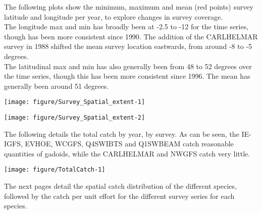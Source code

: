 \documentclass[12pt]{article}\usepackage[]{graphicx}\usepackage[]{color}
\makeatletter
\def\maxwidth{ %
  \ifdim\Gin@nat@width>\linewidth
    \linewidth
  \else
    \Gin@nat@width
  \fi
}
\newenvironment{knitrout}{}{} %
\makeatother
\begin{document}
The following plots show the minimum, maximum and mean (red points) survey
latitude and longitude per year, to explore changes in survey coverage. \\

The longitude max and min has broadly been at -2.5 to -12 for the time series,
though has been more consistent since 1990. The addition of the CARLHELMAR
survey in 1988 shifted the mean survey location eastwards, from around -8 to -5
degrees. \\

The latitudinal max and min has also generally been from 48 to 52 degrees over
the time series, though this has been more consistent since 1996. The mean has
generally been around 51 degrees.


\begin{knitrout}\footnotesize
{}\color{fgcolor}

{\centering \texttt{[image: figure/Survey\_Spatial\_extent-1]} 

}




{\centering \texttt{[image: figure/Survey\_Spatial\_extent-2]} 

}



\end{knitrout}


The following details the total catch by year, by survey. As can be seen, the
IE-IGFS, EVHOE, WCGFS, Q4SWIBTS and Q1SWBEAM catch reasonable quantities of
gadoids, while the CARLHELMAR and NWGFS catch very little. \\

\begin{knitrout}\footnotesize
{}\color{fgcolor}

{\centering \texttt{[image: figure/TotalCatch-1]} 

}



\end{knitrout}

The next pages detail the spatial catch distribution of the different species,
followed by the catch per unit effort for the different survey series for each
species. 
\end{document}
